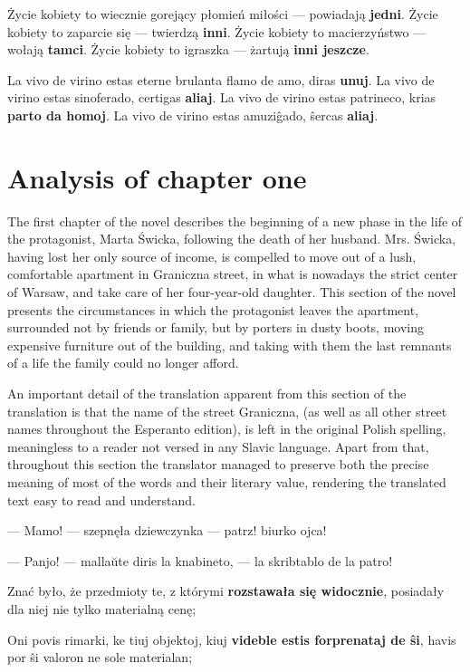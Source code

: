 
Życie kobiety to wiecznie gorejący płomień miłości --- powiadają \textbf{jedni}.
Życie kobiety to zaparcie się --- twierdzą \textbf{inni}.
Życie kobiety to macierzyństwo --- wołają \textbf{tamci}.
Życie kobiety to igraszka --- żartują \textbf{inni jeszcze}.

La vivo de virino estas eterne brulanta flamo de amo, diras \textbf{unuj}. La vivo de virino estas sinoferado, certigas \textbf{aliaj}. La vivo de virino estas patrineco, krias \textbf{parto da homoj}. La vivo de virino estas amuziĝado, ŝercas \textbf{aliaj}.

\section{Analysis of chapter one}

The first chapter of the novel describes the beginning of a new phase in the life of the protagonist, Marta Świcka, following the death of her husband.
Mrs. Świcka, having lost her only source of income, is compelled to move out of a lush, comfortable apartment in Graniczna street, in what is nowadays the strict center of Warsaw, and take care of her four-year-old daughter.
This section of the novel presents the circumstances in which the protagonist leaves the apartment, surrounded not by friends or family, but by porters in dusty boots, moving expensive furniture out of the building, and taking with them the last remnants of a life the family could no longer afford.

An important detail of the translation apparent from this section of the translation is that the name of the street Graniczna, (as well as all other street names throughout the Esperanto edition), is left in the original Polish spelling, meaningless to a reader not versed in any Slavic language. %
Apart from that, throughout this section the translator managed to preserve both the precise meaning of most of the words and their literary value, rendering the translated text easy to read and understand.

--- Mamo! --- szepnęła dziewczynka --- patrz! biurko ojca!

--- Panjo! --- mallaŭte diris la knabineto, --- la skribtablo de la patro!

Znać było, że przedmioty te, z którymi \textbf{rozstawała się widocznie}, posiadały dla niej nie tylko materialną cenę;

Oni povis rimarki, ke tiuj objektoj, kiuj \textbf{videble estis forprenataj de ŝi}, havis por ŝi valoron ne sole materialan;

